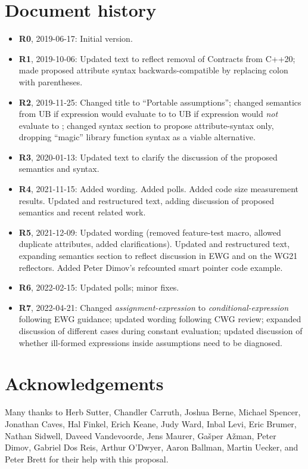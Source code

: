 \section*{Document history}

\begin{itemize}
\item \textbf{R0}, 2019-06-17: Initial version.
\item \textbf{R1}, 2019-10-06: Updated text to reflect removal of Contracts from C++20; made proposed attribute syntax backwards-compatible by replacing colon with parentheses.
\item \textbf{R2}, 2019-11-25: Changed title to ``Portable assumptions''; changed semantics from UB if expression would evaluate to  to UB if expression would \emph{not} evaluate to ; changed syntax section to propose attribute-syntax only, dropping ``magic'' library function syntax as a viable alternative.
\item \textbf {R3}, 2020-01-13: Updated text to clarify the discussion of the proposed semantics and syntax.
\item \textbf{R4}, 2021-11-15:  Added wording. Added polls. Added code size measurement results. Updated and restructured text, adding discussion of proposed semantics and recent related work.
\item \textbf{R5}, 2021-12-09: Updated wording (removed feature-test macro, allowed duplicate attributes, added clarifications). Updated and restructured text, expanding semantics section to reflect discussion in EWG and on the WG21 reflectors. Added Peter Dimov's refcounted smart pointer code example.
\item \textbf{R6}, 2022-02-15: Updated polls; minor fixes.
\item \textbf{R7}, 2022-04-21: Changed \emph{assignment-expression} to \emph{conditional-expression} following EWG guidance; updated wording following CWG review; expanded discussion of different cases during constant evaluation; updated discussion of whether ill-formed expressions inside assumptions need to be diagnosed.
\end{itemize}

\section*{Acknowledgements}

Many thanks to Herb Sutter, Chandler Carruth, Joshua Berne, Michael Spencer, Jonathan Caves, Hal Finkel, Erich Keane, Judy Ward, Inbal Levi, Eric Brumer, Nathan Sidwell, Daveed Vandevoorde, Jens Maurer, Ga\v sper A\v zman, Peter Dimov, Gabriel Dos Reis, Arthur O'Dwyer, Aaron Ballman, Martin Uecker, and Peter Brett for their help with this proposal.

\renewcommand{\bibname}{References}



